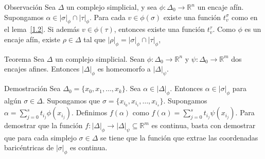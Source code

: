 \documentclass[spanish, presentation]{beamer}
\begin{document}
\begin{frame}[label={sec:orgb57b3ee}]{Observación}
Sea \(\Delta\) un complejo simplicial, y sea \(\phi\colon\Delta_{0}\to \mathbb{R}^{n}\) un encaje afín. Supongamos \(\alpha\in|\sigma|_{\phi}\cap|\tau|_{\phi}\). Para cada \(v\in \phi(\sigma)\) existe una función \(t_{v}^{\sigma}\) como en el lema \ref{1.2}. Si además \(v\in\phi(\tau)\), entonces existe una función \(t_{v}^{\tau}\). Como \(\phi\) es un encaje afín, existe \(\rho\in\Delta\) tal que \(|\rho|_{\phi}=|\sigma|_{\phi}\cap|\tau|_{\phi}\), 
\end{frame}

\begin{frame}[label={sec:org4e29dd7}]{Teorema}
Sea \(\Delta\) un complejo simplicial. Sean \(\phi\colon\Delta_{0}\to \mathbb{R}^{n}\) y \(\psi\colon\Delta_{0}\to \mathbb{R}^{m}\) dos encajes afines. Entonces \(|\Delta|_{\phi}\) es homeomorfo a \(|\Delta|_{\psi}\). 
\end{frame}

\begin{frame}[label={sec:org8a937c4}]{Demostración}
Sea \(\Delta_{0}=\{x_{0},x_{1},\ldots,x_{k}\}\). Sea \(\alpha\in |\Delta|_{\phi}\). Entonces \(\alpha\in |\sigma|_{\phi}\) para algún \(\sigma\in\Delta\). Supongamos que \(\sigma=\{x_{i_{0}},x_{i_{i}},\ldots,x_{i_{s}}\}\). Supongamos \(\alpha=\sum_{j=0}^{s} t_{i_{j}}\phi(x_{i_{j}})\). Definimos \(f(\alpha)\) como \(f(\alpha)=\sum_{j=0}^{s} t_{i_{j}}\psi(x_{i_{j}})\). Para demostrar que la función \(f\colon |\Delta|_{\phi}\to |\Delta|_{\psi}\subseteq\mathbb{R}^{m}\) es continua, basta con demostrar que para cada simplejo \(\sigma\in\Delta\) se tiene que la función que extrae las coordenadas baricéntricas de \(|\sigma|_{\phi}\) es continua.
\end{frame}
\end{document}
